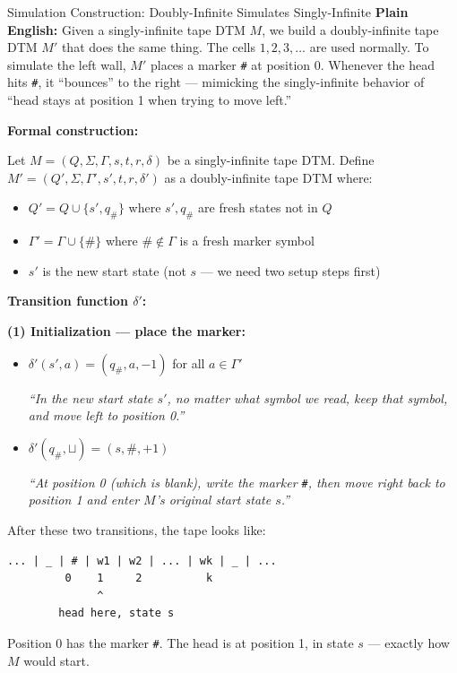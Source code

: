 \begin{definitionbox}{{Simulation Construction: Doubly-Infinite Simulates Singly-Infinite}}
\textbf{Plain English:}
Given a singly-infinite tape DTM $M$, we build a doubly-infinite tape DTM
$M'$ that does the same thing. The cells $1, 2, 3, \ldots$ are used normally.
To simulate the left wall, $M'$ places a marker \texttt{\#} at position 0.
Whenever the head hits \texttt{\#}, it ``bounces'' to the right --- mimicking
the singly-infinite behavior of ``head stays at position 1 when trying to
move left.''

\textbf{Formal construction:}

Let $M = (Q, \Sigma, \Gamma, s, t, r, \delta)$ be a singly-infinite tape DTM.
Define $M' = (Q', \Sigma, \Gamma', s', t, r, \delta')$ as a doubly-infinite
tape DTM where:

\begin{itemize}[nosep]
\item $Q' = Q \cup \{s', q_\#\}$ where $s', q_\#$ are fresh states not in $Q$
\item $\Gamma' = \Gamma \cup \{\#\}$ where $\# \notin \Gamma$ is a fresh marker
  symbol
\item $s'$ is the new start state (not $s$ --- we need two setup steps first)
\end{itemize}

\textbf{Transition function $\delta'$:}

\textbf{(1) Initialization --- place the marker:}
\begin{itemize}[nosep]
\item $\delta'(s', a) = (q_\#, a, -1)$ for all $a \in \Gamma'$

  \textit{``In the new start state $s'$, no matter what symbol we read,
  keep that symbol, and move left to position 0.''}
\item $\delta'(q_\#, \sqcup) = (s, \#, +1)$

  \textit{``At position 0 (which is blank), write the marker \texttt{\#},
  then move right back to position 1 and enter $M$'s original start state
  $s$.''}
\end{itemize}

After these two transitions, the tape looks like:
\begin{lstlisting}
... | _ | # | w1 | w2 | ... | wk | _ | ...
         0    1     2          k
              ^
        head here, state s
\end{lstlisting}
Position 0 has the marker \texttt{\#}. The head is at position 1, in state
$s$ --- exactly how $M$ would start.


\end{definitionbox}

